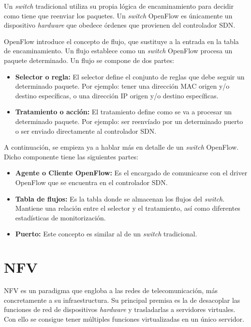 Un \textit{switch} tradicional utiliza su propia lógica de encaminamiento para decidir como tiene que reenviar los paquetes. Un \textit{switch} OpenFlow es únicamente un dispositivo \textit{hardware} que obedece órdenes que provienen del controlador \ac{SDN}.

OpenFlow introduce el concepto de flujo, que sustituye a la entrada en la tabla de encaminamiento. Un flujo establece como un \textit{switch} OpenFlow procesa un paquete determinado. Un flujo se compone de dos partes:

\begin{itemize}
	\item \textbf{Selector o regla:} El selector define el conjunto de reglas que debe seguir un determinado paquete. Por ejemplo: tener una dirección MAC origen y/o destino específicas, o una dirección \ac{IP} origen y/o destino específicas. 
	
	\item \textbf{Tratamiento o acción:} El tratamiento define como se va a procesar un determinado paquete. Por ejemplo: ser reenvíado por un determinado puerto o ser enviado directamente al controlador \ac{SDN}.
\end{itemize}
	
A continuación, se empieza ya a hablar más en detalle de un \textit{switch} OpenFlow. Dicho componente tiene las siguientes partes:

\begin{itemize}
	\item \textbf{Agente o Cliente OpenFlow:} Es el encargado de comunicarse con el driver OpenFlow que se encuentra en el controlador \ac{SDN}.
	
	\item \textbf{Tabla de flujos:} Es la tabla donde se almacenan los flujos del \textit{switch}. Mantiene una relación entre el selector y el tratamiento, así como diferentes estadísticas de monitorización.
	
	\item \textbf{Puerto:} Este concepto es similar al de un \textit{switch} tradicional.
\end{itemize}

\section{NFV}
\label{sec:nfv}

\ac{NFV}\cite{nfvbib} es un paradigma que engloba a las redes de telecomunicación, más concretamente a su infraestructura. Su principal premisa es la de desacoplar las funciones de red de dispositivos \textit{hardware} y trasladarlas a servidores virtuales. Con ello se consigue tener múltiples funciones virtualizadas en un único servidor.

